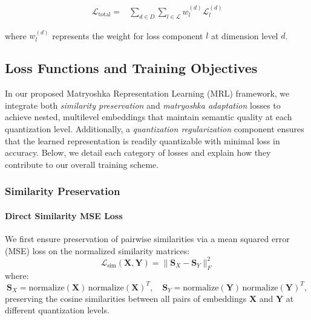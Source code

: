 \begin{equation}
\begin{split}
    \mathcal{L}_{\text{total}} = & \sum_{d \in D} \sum_{l \in \mathcal{L}} w_l^{(d)} \mathcal{L}_l^{(d)}
\end{split}
\end{equation}

where $w_l^{(d)}$ represents the weight for loss component $l$ at dimension level $d$.

\subsection{Loss Functions and Training Objectives}

In our proposed Matryoshka Representation Learning (MRL) framework, we integrate both \emph{similarity preservation} and \emph{matryoshka adaptation} losses to achieve nested, multilevel embeddings that maintain semantic quality at each quantization level. Additionally, a \emph{quantization regularization} component ensures that the learned representation is readily quantizable with minimal loss in accuracy. Below, we detail each category of losses and explain how they contribute to our overall training scheme.

\subsubsection{Similarity Preservation}

\paragraph{Direct Similarity MSE Loss}
We first ensure preservation of pairwise similarities via a mean squared error (MSE) loss on the normalized similarity matrices:
\begin{equation}
    \mathcal{L}_{\text{sim}}(\mathbf{X}, \mathbf{Y}) = \|\mathbf{S}_X - \mathbf{S}_Y\|_F^2
\end{equation}
where:
\begin{equation}
    \mathbf{S}_X = \text{normalize}(\mathbf{X}) \,\text{normalize}(\mathbf{X})^T, 
    \quad 
    \mathbf{S}_Y = \text{normalize}(\mathbf{Y}) \,\text{normalize}(\mathbf{Y})^T,
\end{equation}
preserving the cosine similarities between all pairs of embeddings $\mathbf{X}$ and $\mathbf{Y}$ at different quantization levels.

